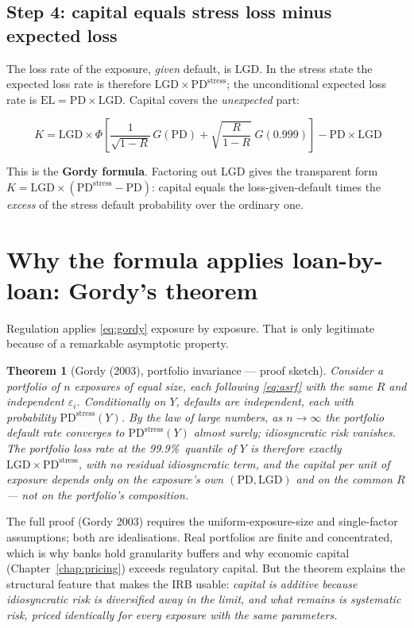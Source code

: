 \documentclass[11pt,a4paper]{report}
\theoremstyle{definition}
\theoremstyle{plain}
\newtheorem{theorem}[definition]{Theorem}
\newcommand{\PD}{\mathrm{PD}}
\newcommand{\LGD}{\mathrm{LGD}}
\newcommand{\EL}{\mathrm{EL}}
\begin{document}
\subsection{Step 4: capital equals stress loss minus expected loss}

The loss rate of the exposure, \emph{given} default, is $\LGD$. In the
stress state the expected loss rate is therefore
$\LGD\times\PD^{\text{stress}}$; the unconditional expected loss rate is
$\EL=\PD\times\LGD$. Capital covers the \emph{unexpected} part:

\begin{equation}
  \boxed{\;
  K=\LGD\times\Phi\!\left[
  \frac{1}{\sqrt{1-R}}\,G(\PD)
  +\sqrt{\frac{R}{1-R}}\;G(0.999)\right]-\PD\times\LGD}
  \label{eq:gordy}
\end{equation}

This is the \textbf{Gordy formula}. Factoring out $\LGD$ gives the
transparent form $K=\LGD\times(\PD^{\text{stress}}-\PD)$: capital
equals the loss-given-default times the \emph{excess} of the stress
default probability over the ordinary one.

\section{Why the formula applies loan-by-loan: Gordy's theorem}

Regulation applies \eqref{eq:gordy} exposure by exposure. That is only
legitimate because of a remarkable asymptotic property.

\begin{theorem}[Gordy (2003), portfolio invariance --- proof sketch]
\label{thm:gordy}
Consider a portfolio of $n$ exposures of equal size, each following
\eqref{eq:asrf} with the same $R$ and independent
$\varepsilon_i$. Conditionally on $Y$, defaults are independent, each
with probability $\PD^{\text{stress}}(Y)$. By the law of large numbers,
as $n\to\infty$ the portfolio default rate converges to
$\PD^{\text{stress}}(Y)$ almost surely; idiosyncratic risk vanishes. The
portfolio loss rate at the 99.9\%\ quantile of $Y$ is therefore
exactly $\LGD\times\PD^{\text{stress}}$, with no residual idiosyncratic
term, and the capital per unit of exposure depends \emph{only} on the
exposure's own $(\PD,\LGD)$ and on the common $R$ --- not on the
portfolio's composition.
\end{theorem}

The full proof (Gordy 2003) requires the uniform-exposure-size and
single-factor assumptions; both are idealisations. Real portfolios are
finite and concentrated, which is why banks hold granularity buffers and
why economic capital (Chapter~\ref{chap:pricing}) exceeds regulatory
capital. But the theorem explains the structural feature that makes the
IRB usable: \emph{capital is additive because idiosyncratic risk is
diversified away in the limit, and what remains is systematic risk,
priced identically for every exposure with the same parameters.}
\end{document}
